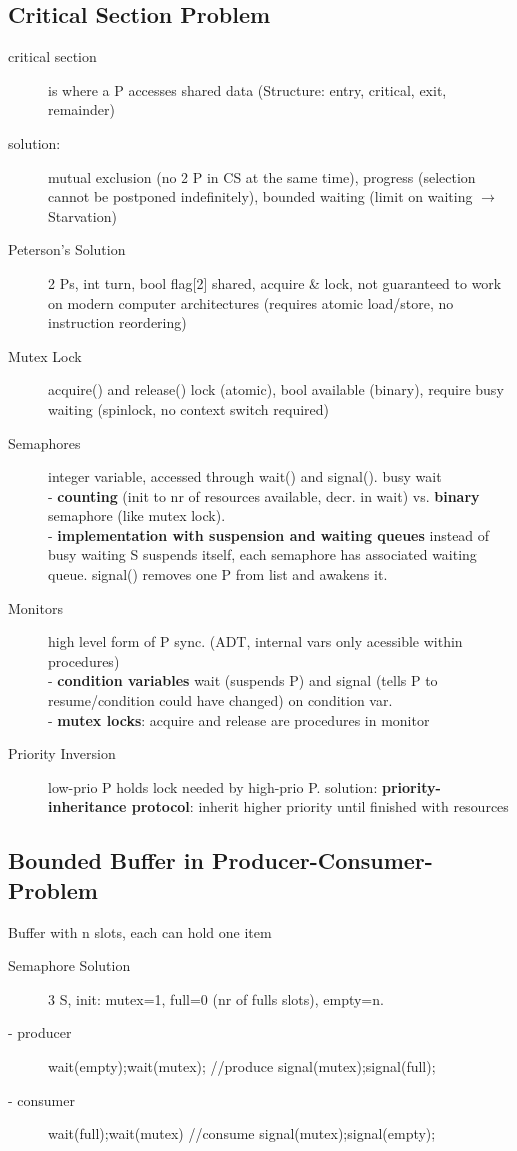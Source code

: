 \subsection*{Critical Section Problem}
\begin{description}
    \item[critical section]is where a P accesses shared data (Structure: entry, critical, exit, remainder)
    \item[solution:]mutual exclusion (no 2 P in CS at the same time), progress (selection cannot be postponed indefinitely), bounded waiting (limit on waiting $\rightarrow$ Starvation)
    \item[Peterson's Solution]2 Ps, int turn, bool flag[2] shared, acquire \& lock, not guaranteed to work on modern computer architectures (requires atomic load/store, no instruction reordering)
    \item[Mutex Lock] acquire() and release() lock (atomic), bool available (binary), require busy waiting (spinlock, no context switch required)
    \item[Semaphores] integer variable, accessed through wait() and signal(). busy wait \\
        - \textbf{counting} (init to nr of resources available, decr. in wait) vs. \textbf{binary} semaphore (like mutex lock). \\
        -  \textbf{implementation with suspension and waiting queues} instead of busy waiting S suspends itself, each semaphore has associated waiting queue. signal() removes one P from list and awakens it.   %
    \item[Monitors] high level form of P sync. (ADT, internal vars only acessible within procedures) \\
        - \textbf{condition variables} wait (suspends P) and signal (tells P to resume/condition could have changed) on condition var. \\
        - \textbf{mutex locks}: acquire and release are procedures in monitor
    \item[Priority Inversion] low-prio P holds lock needed by high-prio P. solution: \textbf{priority-inheritance protocol}: inherit higher priority until finished with resources
\end{description}

\subsection*{Bounded Buffer in Producer-Consumer-Problem}
Buffer with n slots, each can hold one item
\begin{description}
    \item[Semaphore Solution]3 S, init: mutex=1, full=0 (nr of fulls slots), empty=n.
    \item[- producer]wait(empty);wait(mutex); //produce signal(mutex);signal(full);
    \item[- consumer]wait(full);wait(mutex) //consume signal(mutex);signal(empty);
\end{description}

